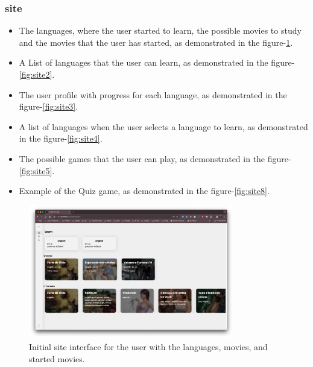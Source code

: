 \documentclass[12pt]{article}
\begin{document}
\subsubsection{site}
\begin{itemize}
\item The languages, where the user started to learn, the possible movies to study and the movies that the user has started, as demonstrated in the figure-\ref{fig:site1}.
\item A List of languages that the user can learn, as demonstrated in the figure-\ref{fig:site2}.
\item The user profile with progress for each language, as demonstrated in the figure-\ref{fig:site3}.
\item A list of languages when the user selects a language to learn, as demonstrated in the figure-\ref{fig:site4}.
\item The possible games that the user can play, as demonstrated in the figure-\ref{fig:site5}.
\item Example of the Quiz game, as demonstrated in the figure-\ref{fig:site8}.
\end{itemize}
  \begin{figure}[h]
   \centering
   \caption{
   Initial site interface for the user with the languages, movies, and started movies.
    }
   \label{fig:site1}
   \includegraphics[width=0.8\textwidth]{assets/20.png}
  \end{figure}
\end{document}
